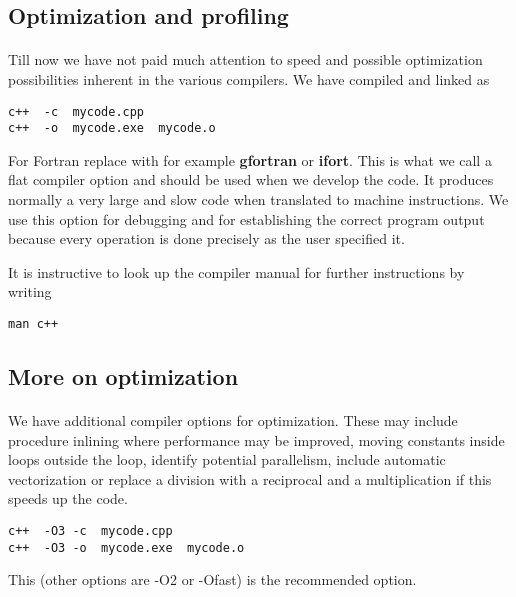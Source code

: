 \documentclass[%
oneside,                 %
final,                   %
10pt]{article}
\begin{document}
\noindent
\subsection*{Optimization and profiling}

\paragraph{}


Till now we have not paid much attention to speed and possible optimization possibilities
inherent in the various compilers. We have compiled and linked as
\begin{verbatim}
c++  -c  mycode.cpp
c++  -o  mycode.exe  mycode.o
\end{verbatim}
For Fortran replace with for example \textbf{gfortran} or \textbf{ifort}.
This is what we call a flat compiler option and should be used when we develop the code.
It produces normally a very large and slow code when translated to machine instructions.
We use this option for debugging and for establishing the correct program output because
every operation is done precisely as the user specified it.

It is instructive to look up the compiler manual for further instructions by writing
\begin{verbatim}
man c++
\end{verbatim}


\subsection*{More on optimization}

\paragraph{}
We have additional compiler options for optimization. These may include procedure inlining where 
performance may be improved, moving constants inside loops outside the loop, 
identify potential parallelism, include automatic vectorization or replace a division with a reciprocal
and a multiplication if this speeds up the code.
\begin{verbatim}
c++  -O3 -c  mycode.cpp
c++  -O3 -o  mycode.exe  mycode.o
\end{verbatim}
This (other options are -O2 or -Ofast) is the recommended option.
\end{document}
